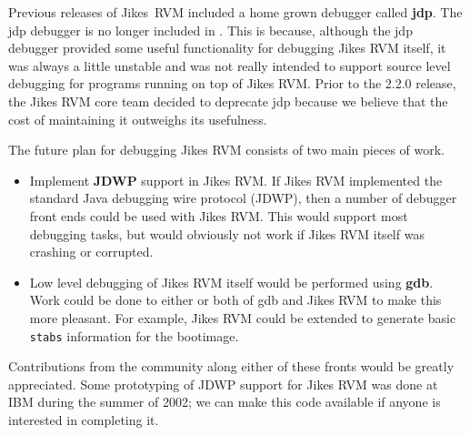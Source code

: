 Previous releases of Jikes\JikesTMFootnote\ RVM included a home grown
debugger called {\bf jdp}.  The jdp debugger is no longer included in
\jrvm{}.  This is because, although the jdp debugger provided some
useful functionality for debugging Jikes RVM itself, it was always a
little unstable and was not really intended to support source level
debugging for programs running on top of Jikes RVM.  Prior to the
2.2.0 release, the Jikes RVM core team decided to deprecate jdp
because we believe that the cost of maintaining it outweighs its
usefulness.


The future plan for debugging Jikes RVM consists of two main pieces of
work. 
\begin{itemize}
\item Implement {\bf JDWP} support in Jikes RVM. If Jikes RVM
implemented the standard Java debugging wire protocol (JDWP), then a
number of debugger front ends could be used with Jikes RVM.  This
would support most debugging tasks, but would obviously not work if
Jikes RVM itself was crashing or corrupted.

\item Low level debugging of Jikes RVM itself would be performed using
{\bf gdb}.  Work could be done to either or both of gdb and Jikes RVM
to make this more pleasant.  For example, Jikes RVM could be extended to
generate basic {\tt stabs} information for the bootimage.
\end{itemize}
Contributions from the community along either of these fronts would be
greatly appreciated.  Some prototyping of JDWP support for Jikes RVM
was done at IBM during the summer of 2002; we can make this code
available if anyone is interested in completing it.


